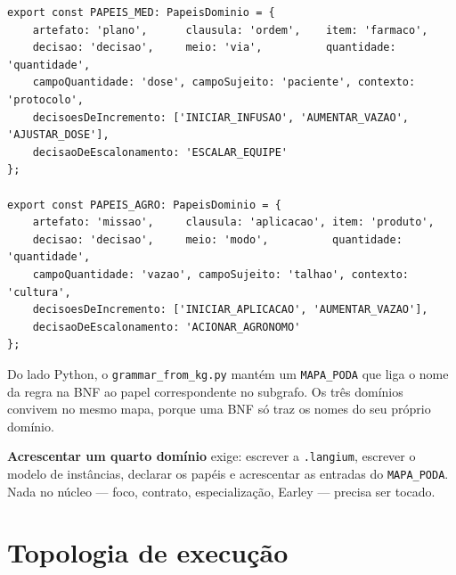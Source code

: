 \documentclass[11pt,a4paper]{article}
\newcommand{\arq}[1]{\texttt{\small #1}}
\begin{document}
\begin{lstlisting}
export const PAPEIS_MED: PapeisDominio = {
    artefato: 'plano',      clausula: 'ordem',    item: 'farmaco',
    decisao: 'decisao',     meio: 'via',          quantidade: 'quantidade',
    campoQuantidade: 'dose', campoSujeito: 'paciente', contexto: 'protocolo',
    decisoesDeIncremento: ['INICIAR_INFUSAO', 'AUMENTAR_VAZAO', 'AJUSTAR_DOSE'],
    decisaoDeEscalonamento: 'ESCALAR_EQUIPE'
};

export const PAPEIS_AGRO: PapeisDominio = {
    artefato: 'missao',     clausula: 'aplicacao', item: 'produto',
    decisao: 'decisao',     meio: 'modo',          quantidade: 'quantidade',
    campoQuantidade: 'vazao', campoSujeito: 'talhao', contexto: 'cultura',
    decisoesDeIncremento: ['INICIAR_APLICACAO', 'AUMENTAR_VAZAO'],
    decisaoDeEscalonamento: 'ACIONAR_AGRONOMO'
};
\end{lstlisting}

Do lado Python, o \arq{grammar\_from\_kg.py} mantém um \texttt{MAPA\_PODA} que
liga o nome da regra na BNF ao papel correspondente no subgrafo. Os três
domínios convivem no mesmo mapa, porque uma BNF só traz os nomes do seu próprio
domínio.

\textbf{Acrescentar um quarto domínio} exige: escrever a \arq{.langium},
escrever o modelo de instâncias, declarar os papéis e acrescentar as entradas do
\texttt{MAPA\_PODA}. Nada no núcleo --- foco, contrato, especialização, Earley
--- precisa ser tocado.

\section{Topologia de execução}
\end{document}
